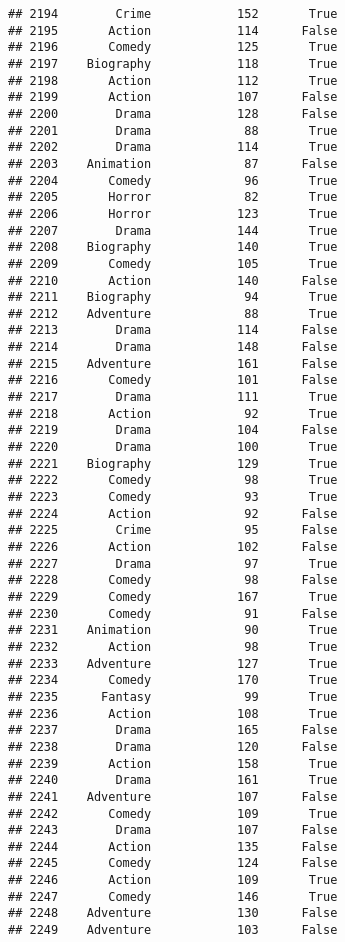 \documentclass[
]{article}
\begin{document}
\begin{verbatim}
## 2194        Crime            152       True
## 2195       Action            114      False
## 2196       Comedy            125       True
## 2197    Biography            118       True
## 2198       Action            112       True
## 2199       Action            107      False
## 2200        Drama            128      False
## 2201        Drama             88       True
## 2202        Drama            114       True
## 2203    Animation             87      False
## 2204       Comedy             96       True
## 2205       Horror             82       True
## 2206       Horror            123       True
## 2207        Drama            144       True
## 2208    Biography            140       True
## 2209       Comedy            105       True
## 2210       Action            140      False
## 2211    Biography             94       True
## 2212    Adventure             88       True
## 2213        Drama            114      False
## 2214        Drama            148      False
## 2215    Adventure            161      False
## 2216       Comedy            101      False
## 2217        Drama            111       True
## 2218       Action             92       True
## 2219        Drama            104      False
## 2220        Drama            100       True
## 2221    Biography            129       True
## 2222       Comedy             98       True
## 2223       Comedy             93       True
## 2224       Action             92      False
## 2225        Crime             95      False
## 2226       Action            102      False
## 2227        Drama             97       True
## 2228       Comedy             98      False
## 2229       Comedy            167       True
## 2230       Comedy             91      False
## 2231    Animation             90       True
## 2232       Action             98       True
## 2233    Adventure            127       True
## 2234       Comedy            170       True
## 2235      Fantasy             99       True
## 2236       Action            108       True
## 2237        Drama            165      False
## 2238        Drama            120      False
## 2239       Action            158       True
## 2240        Drama            161       True
## 2241    Adventure            107      False
## 2242       Comedy            109       True
## 2243        Drama            107      False
## 2244       Action            135      False
## 2245       Comedy            124      False
## 2246       Action            109       True
## 2247       Comedy            146       True
## 2248    Adventure            130      False
## 2249    Adventure            103      False

\end{verbatim}
\end{document}
